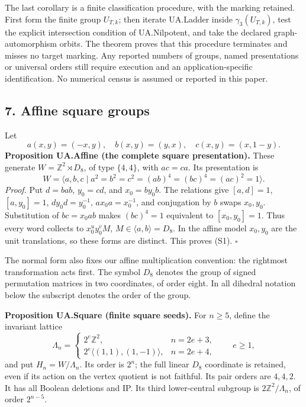 \documentclass[
  11pt,
  a4paper,
]{article}
\begin{document}
The last corollary is a finite classification procedure, with the
marking retained. First form the finite group \(U_{T,k}\); then iterate
UA.Ladder inside \(\gamma_3(U_{T,k})\), test the explicit intersection
condition of UA.Nilpotent, and take the declared graph-automorphism
orbits. The theorem proves that this procedure terminates and misses no
target marking. Any reported numbers of groups, named presentations or
universal orders still require execution and an application-specific
identification. No numerical census is assumed or reported in this
paper.

\subsection{7. Affine square groups}\label{affine-square-groups}

Let \[
 a(x,y)=(-x,y),\quad b(x,y)=(y,x),\quad c(x,y)=(x,1-y).
\] \textbf{Proposition UA.Affine (the complete square presentation).}
These generate \(W=\mathbb Z^2\rtimes D_8\), of type \(\{4,4\}\), with
\(ac=ca\). Its presentation is \[
 W=\langle a,b,c\mid a^2=b^2=c^2=(ab)^4=(bc)^4=(ac)^2=1\rangle. \tag{S1}
\] \emph{Proof.} Put \(d=bab\), \(y_0=cd\), and \(x_0=by_0b\). The
relations give \([a,d]=1\), \([a,y_0]=1\), \(dy_0d=y_0^{-1}\),
\(ax_0a=x_0^{-1}\), and conjugation by \(b\) swaps \(x_0,y_0\).
Substitution of \(bc=x_0ab\) makes \((bc)^4=1\) equivalent to
\([x_0,y_0]=1\). Thus every word collects to \(x_0^u y_0^v M\),
\(M\in\langle a,b\rangle=D_8\). In the affine model \(x_0,y_0\) are the
unit translations, so these forms are distinct. This proves (S1).
\(\square\)

The normal form also fixes our affine multiplication convention: the
rightmost transformation acts first. The symbol \(D_8\) denotes the
group of signed permutation matrices in two coordinates, of order eight.
In all dihedral notation below the subscript denotes the order of the
group.

\textbf{Proposition UA.Square (finite square seeds).} For \(n\ge5\),
define the invariant lattice \[
 \Lambda_n=\begin{cases}
  2^e\mathbb Z^2,&n=2e+3,\\
  2^e\langle(1,1),(1,-1)\rangle,&n=2e+4,
 \end{cases}\qquad e\ge1,
\] and put \(H_n=W/\Lambda_n\). Its order is \(2^n\); the full linear
\(D_8\) coordinate is retained, even if its action on the vertex
quotient is not faithful. Its pair orders are \(4,4,2\). It has all
Boolean deletions and IP. Its third lower-central subgroup is
\(2\mathbb Z^2/\Lambda_n\), of order \(2^{n-5}\).
\end{document}
